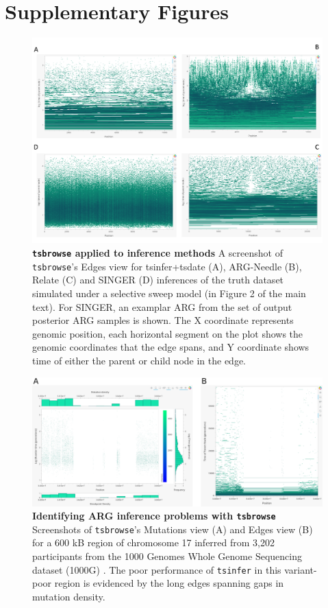 \documentclass[unnumsec,webpdf,contemporary,large,namedate]{oup-authoring-template}%
\begin{document}
\section{Supplementary Figures}
\begin{figure}
    \centering
    \includegraphics[width=0.95\linewidth]{figures/SuppFig1.png}
    \caption{\textbf{\texttt{tsbrowse} applied to inference methods}
    A screenshot of \texttt{tsbrowse}'s Edges view for tsinfer+tsdate (A),
ARG-Needle (B), Relate (C) and SINGER (D) inferences of the truth dataset
simulated under a selective sweep model (in Figure 2 of the main text). For
SINGER, an examplar ARG from the set of output posterior ARG samples is shown.
The X coordinate represents genomic position, each horizontal segment on the
plot shows the genomic coordinates that the edge spans, and Y coordinate shows
time of either the parent or child node in the edge.}
    \label{fig:Supplementary_Figure_1}
\end{figure}

\begin{figure}
    \centering
    \includegraphics[width=0.95\linewidth]{figures/SuppFig2.png}
    \caption{\textbf{Identifying ARG inference problems with \texttt{tsbrowse}} 
Screenshots of \texttt{tsbrowse}'s Mutations view (A) and Edges view (B) for a
 600 kB region of chromosome 17 inferred from 3,202 participants from the 1000 
 Genomes Whole Genome Sequencing dataset (1000G) \citep{1000G2015, 1000GWGS}. 
 The poor performance of \texttt{tsinfer} in this variant-poor region is evidenced
  by the long edges spanning gaps in mutation density.}
    \label{fig:Supplementary_Figure_2}
\end{figure}
\end{document}
